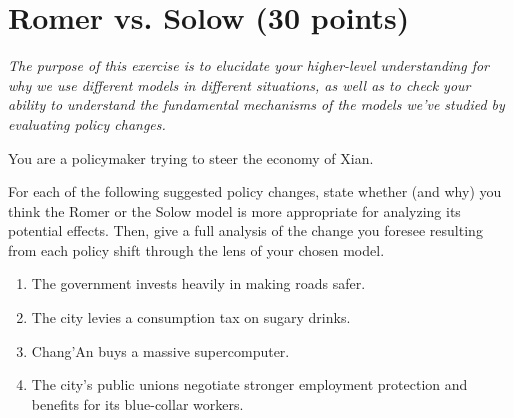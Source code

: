 \documentclass{article}
\begin{document}
\section*{Romer vs. Solow (30 points)}

\small{\textit{The purpose of this exercise is to elucidate your higher-level understanding for why we use different models in different situations, as well as to check your ability to understand the fundamental mechanisms of the models we've studied by evaluating policy changes.}}

You are a policymaker trying to steer the economy of Xian.

For each of the following suggested policy changes, state whether (and why) you think the Romer or the Solow model is more appropriate for analyzing its potential effects. Then, give a full analysis of the change you foresee resulting from each policy shift through the lens of your chosen model.

\begin{enumerate}
\item The government invests heavily in making roads safer.
\item The city levies a consumption tax on sugary drinks.
\item Chang'An buys a massive supercomputer.
\item The city's public unions negotiate stronger employment protection and benefits for its blue-collar workers.
\end{enumerate}
\end{document}
